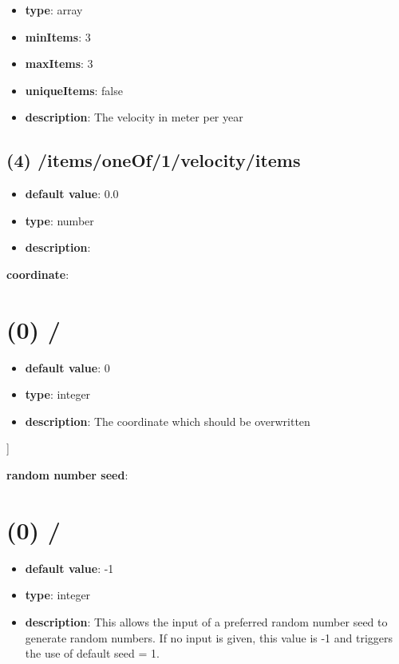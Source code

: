 \begin{itemize}[leftmargin=3em]\item {\bf type}: array
\item {\bf minItems}: 3
\item {\bf maxItems}: 3
\item {\bf uniqueItems}: false
\item {\bf description}: The velocity in meter per year
\end{itemize}\subsection{(4) /items/oneOf/1/velocity/items}
\begin{itemize}[leftmargin=4em]\item {\bf default value}: 0.0
\item {\bf type}: number
\item {\bf description}: 
\end{itemize}\item {\bf coordinate}: \section{(0) /}
\begin{itemize}[leftmargin=0em]\item {\bf default value}: 0
\item {\bf type}: integer
\item {\bf description}: The coordinate which should be overwritten
\end{itemize}]\item {\bf random number seed}: \section{(0) /}
\begin{itemize}[leftmargin=0em]\item {\bf default value}: -1
\item {\bf type}: integer
\item {\bf description}: This allows the input of a preferred random number seed to generate random numbers. If no input is given, this value is -1 and triggers the use of default seed = 1.
\end{itemize}
